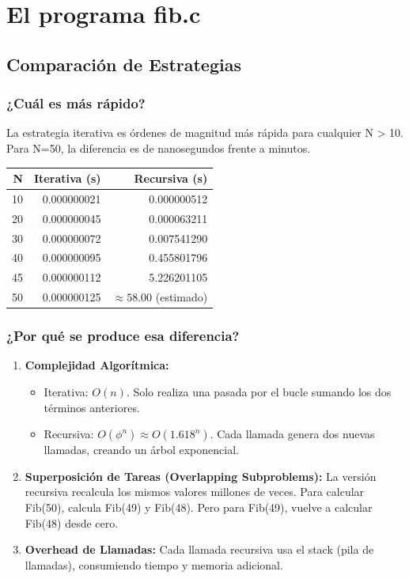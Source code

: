 \documentclass[11pt,a4paper]{article}
\begin{document}
\section{El programa fib.c}

\subsection*{Comparación de Estrategias}

\subsubsection*{¿Cuál es más rápido?}

La estrategia iterativa es órdenes de magnitud más rápida para cualquier N > 10. Para N=50, la diferencia es de nanosegundos frente a minutos.

\begin{center}
\begin{tabular}{|r|r|r|}
\hline
\textbf{N} & \textbf{Iterativa (s)} & \textbf{Recursiva (s)} \\
\hline
10 & 0.000000021 & 0.000000512 \\
20 & 0.000000045 & 0.000063211 \\
30 & 0.000000072 & 0.007541290 \\
40 & 0.000000095 & 0.455801796 \\
45 & 0.000000112 & 5.226201105 \\
50 & 0.000000125 & $\approx 58.00$ (estimado) \\
\hline
\end{tabular}
\end{center}

\subsubsection*{¿Por qué se produce esa diferencia?}

\begin{enumerate}
\item \textbf{Complejidad Algorítmica:}
\begin{itemize}
    \item Iterativa: $O(n)$. Solo realiza una pasada por el bucle sumando los dos términos anteriores.
    \item Recursiva: $O(\phi^n) \approx O(1.618^n)$. Cada llamada genera dos nuevas llamadas, creando un árbol exponencial.
\end{itemize}

\item \textbf{Superposición de Tareas (Overlapping Subproblems):}
La versión recursiva recalcula los mismos valores millones de veces. Para calcular Fib(50), calcula Fib(49) y Fib(48). Pero para Fib(49), vuelve a calcular Fib(48) desde cero.

\item \textbf{Overhead de Llamadas:}
Cada llamada recursiva usa el stack (pila de llamadas), consumiendo tiempo y memoria adicional.
\end{enumerate}
\end{document}
